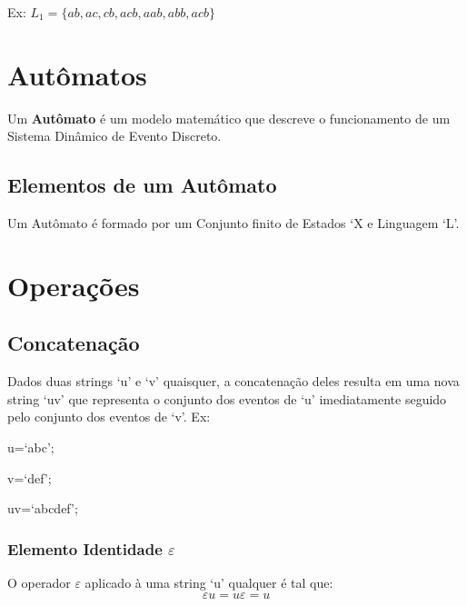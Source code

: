 \documentclass{article}
\begin{document}
Ex: $L_1=\{ab,ac,cb,acb,aab,abb,acb\}$
\section{Autômatos}
Um \textbf{Autômato} é um modelo matemático que descreve o funcionamento de um Sistema Dinâmico de Evento Discreto.
\subsection{Elementos de um Autômato}
Um Autômato é formado por um Conjunto finito de Estados `X e Linguagem `L'.
\section{Operações}
\subsection{Concatenação}
Dados duas strings `u' e `v' quaisquer, a concatenação deles resulta em uma nova string `uv' que representa o conjunto dos eventos de `u' imediatamente seguido pelo conjunto dos eventos de `v'. Ex:

u=`abc';

v=`def'; 

uv=`abcdef'; 
\subsubsection{Elemento Identidade {\large$\varepsilon$}}
O operador \large{$\varepsilon$} aplicado à uma string `u' qualquer é tal que:
$$
\varepsilon u=u\varepsilon =u
$$
\end{document}
